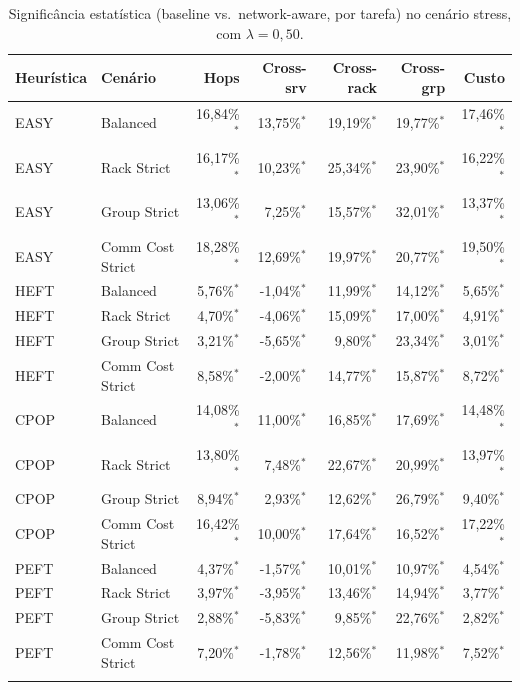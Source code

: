 \begin{table}[htbp]
\centering
\small
\caption{Significância estatística (baseline vs.\ network-aware, por tarefa) no cenário stress, com $\lambda = 0{,}50$.}
\label{tab:significancia_stress_lambda_050}
\begin{tabular}{llrrrrr}
\toprule
Heurística & Cenário & Hops & Cross-srv & Cross-rack & Cross-grp & Custo \\
\midrule
EASY & Balanced & 16,84\%$^{*}$ & 13,75\%$^{*}$ & 19,19\%$^{*}$ & 19,77\%$^{*}$ & 17,46\%$^{*}$ \\
EASY & Rack Strict & 16,17\%$^{*}$ & 10,23\%$^{*}$ & 25,34\%$^{*}$ & 23,90\%$^{*}$ & 16,22\%$^{*}$ \\
EASY & Group Strict & 13,06\%$^{*}$ & 7,25\%$^{*}$ & 15,57\%$^{*}$ & 32,01\%$^{*}$ & 13,37\%$^{*}$ \\
EASY & Comm Cost Strict & 18,28\%$^{*}$ & 12,69\%$^{*}$ & 19,97\%$^{*}$ & 20,77\%$^{*}$ & 19,50\%$^{*}$ \\
\addlinespace
HEFT & Balanced & 5,76\%$^{*}$ & -1,04\%$^{*}$ & 11,99\%$^{*}$ & 14,12\%$^{*}$ & 5,65\%$^{*}$ \\
HEFT & Rack Strict & 4,70\%$^{*}$ & -4,06\%$^{*}$ & 15,09\%$^{*}$ & 17,00\%$^{*}$ & 4,91\%$^{*}$ \\
HEFT & Group Strict & 3,21\%$^{*}$ & -5,65\%$^{*}$ & 9,80\%$^{*}$ & 23,34\%$^{*}$ & 3,01\%$^{*}$ \\
HEFT & Comm Cost Strict & 8,58\%$^{*}$ & -2,00\%$^{*}$ & 14,77\%$^{*}$ & 15,87\%$^{*}$ & 8,72\%$^{*}$ \\
\addlinespace
CPOP & Balanced & 14,08\%$^{*}$ & 11,00\%$^{*}$ & 16,85\%$^{*}$ & 17,69\%$^{*}$ & 14,48\%$^{*}$ \\
CPOP & Rack Strict & 13,80\%$^{*}$ & 7,48\%$^{*}$ & 22,67\%$^{*}$ & 20,99\%$^{*}$ & 13,97\%$^{*}$ \\
CPOP & Group Strict & 8,94\%$^{*}$ & 2,93\%$^{*}$ & 12,62\%$^{*}$ & 26,79\%$^{*}$ & 9,40\%$^{*}$ \\
CPOP & Comm Cost Strict & 16,42\%$^{*}$ & 10,00\%$^{*}$ & 17,64\%$^{*}$ & 16,52\%$^{*}$ & 17,22\%$^{*}$ \\
\addlinespace
PEFT & Balanced & 4,37\%$^{*}$ & -1,57\%$^{*}$ & 10,01\%$^{*}$ & 10,97\%$^{*}$ & 4,54\%$^{*}$ \\
PEFT & Rack Strict & 3,97\%$^{*}$ & -3,95\%$^{*}$ & 13,46\%$^{*}$ & 14,94\%$^{*}$ & 3,77\%$^{*}$ \\
PEFT & Group Strict & 2,88\%$^{*}$ & -5,83\%$^{*}$ & 9,85\%$^{*}$ & 22,76\%$^{*}$ & 2,82\%$^{*}$ \\
PEFT & Comm Cost Strict & 7,20\%$^{*}$ & -1,78\%$^{*}$ & 12,56\%$^{*}$ & 11,98\%$^{*}$ & 7,52\%$^{*}$ \\
\addlinespace
\bottomrule
\end{tabular}


\end{table}
